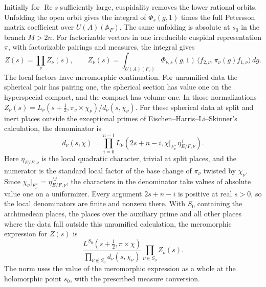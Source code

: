 Initially for \(\operatorname{Re}s\) sufficiently large,
cuspidality removes the lower rational orbits. Unfolding the open
orbit gives the integral of \(\Phi_s(g,1)\) times the full Petersson
matrix coefficient over \(U(A)(\mathbb A_F)\). The same unfolding
is absolute at \(s_0\) in the branch \(M>2n\).
For factorizable vectors in one irreducible cuspidal representation
\(\pi\), with factorizable pairings and measures, the integral gives
\[
 Z(s)=\prod_\nu Z_\nu(s),\qquad
 Z_\nu(s)=\int_{U(A)(F_\nu)}\Phi_{\nu,s}(g,1)\,
     \langle f_{2,\nu},\pi_\nu(g) f_{1,\nu}\rangle\,dg .
\]
The local factors have meromorphic continuation. For unramified data
the spherical pair has pairing one, the spherical section has value
one on the hyperspecial compact, and the compact has volume one.
In those normalizations
\(Z_\nu(s)=L_\nu(s+\tfrac12,\pi_\nu\times\chi_\nu)/
d_\nu(s,\chi_\nu)\).
\cite[\S\S11.5--11.6]{gqt}
For these spherical data at split and inert places outside the
exceptional primes of Eischen--Harris--Li--Skinner's calculation,
the denominator is
\[
 d_\nu(s,\chi)=\prod_{i=0}^{n-1}
      L_\nu(2s+n-i,\chi|_{F_\nu^\times}\eta_{E/F,\nu}^{\,i}).
\]
Here \(\eta_{E/F,\nu}\) is the local quadratic character, trivial
at split places, and the numerator is the standard local factor
of the base change of \(\pi_\nu\) twisted by \(\chi_\nu\).
\cite[Hypotheses~1.4.4 and \S4.2.1, (53)]{p2eischen-doubling}
Since \(\chi_\nu|_{F_\nu^\times}=\eta_{E/F,\nu}^{M}\), the characters
in the denominator take values of absolute value one on a
uniformizer. Every argument \(2s+n-i\) is positive at real \(s>0\),
so the local denominators are finite and nonzero there.
With \(S_0\) containing the archimedean places, the places over the
auxiliary prime and all other places where the data fall outside
this unramified calculation, the meromorphic expression for \(Z(s)\)
is
\[
 \frac{L^{S_0}(s+\tfrac12,\pi\times\chi)}
      {\prod_{\nu\notin S_0}d_\nu(s,\chi_\nu)}
 \prod_{\nu\in S_0}Z_\nu(s).
\]
The norm uses the value of the meromorphic expression as a whole
at the holomorphic point \(s_0\), with the prescribed measure conversion.

